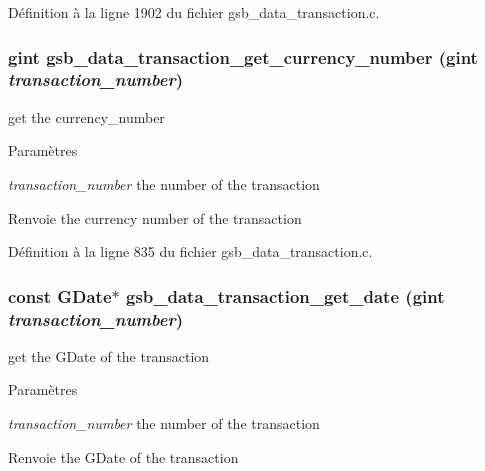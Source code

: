 Définition à la ligne 1902 du fichier gsb\_\-data\_\-transaction.c.

\subsubsection[{gsb\_\-data\_\-transaction\_\-get\_\-currency\_\-number}]{\setlength{\rightskip}{0pt plus 5cm}gint gsb\_\-data\_\-transaction\_\-get\_\-currency\_\-number (gint {\em transaction\_\-number})}\label{gsb__data__transaction_8h_aa39edcb597bd75a438b00b67cf898e88}
get the currency\_\-number 
\begin{DoxyParams}{Paramètres}
\item[{\em transaction\_\-number}]the number of the transaction \end{DoxyParams}
\begin{DoxyReturn}{Renvoie}
the currency number of the transaction 
\end{DoxyReturn}


Définition à la ligne 835 du fichier gsb\_\-data\_\-transaction.c.

\subsubsection[{gsb\_\-data\_\-transaction\_\-get\_\-date}]{\setlength{\rightskip}{0pt plus 5cm}const GDate$\ast$ gsb\_\-data\_\-transaction\_\-get\_\-date (gint {\em transaction\_\-number})}\label{gsb__data__transaction_8h_ab0b62014885bcf3e2fbfff1ae9b32080}
get the GDate of the transaction


\begin{DoxyParams}{Paramètres}
\item[{\em transaction\_\-number}]the number of the transaction\end{DoxyParams}
\begin{DoxyReturn}{Renvoie}
the GDate of the transaction 
\end{DoxyReturn}



